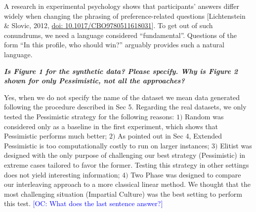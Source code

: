 \documentclass{article}
\newcommand{\commentOC}[1]{\textcolor{blue}{\small$\big[$OC: #1$\big]$}}
\begin{document}
A research in experimental psychology shows that participants’ answers differ widely when changing the phrasing of preference-related questions [Lichtenstein \& Slovic, 2012, \href{https://doi.org/10.1017/CBO9780511618031}{doi: 10.1017/CBO9780511618031}].
To get out of such conundrums, we need a language considered “fundamental”. Questions of the form “In this profile, who should win?” arguably provides such a natural language.


\textit{\textbf{Is Figure 1 for the synthetic data? Please specify. Why is Figure 2 shown for only Pessimistic, not all the approaches?}}

Yes, when we do not specify the name of the dataset we mean data generated following the procedure described in Sec 5. Regarding the real datasets, we only tested the Pessimistic strategy for the following reasons: $1)$ Random was considered only as a baseline in the first experiment, which shows that Pessimistic performs much better; $2)$ As pointed out in Sec 4, Extended Pessimistic is too computationally costly to run on larger instances; $3)$ Elitist was designed with the only purpose of challenging our best strategy (Pessimistic) in extreme cases tailored to favor the former. Testing this strategy in other settings does not yield interesting information; $4)$ Two Phase was designed to compare our interleaving approach to a more classical linear method. We thought that the most challenging situation (Impartial Culture) was the best setting to perform this test. \commentOC{What does the last sentence answer?}
\end{document}
